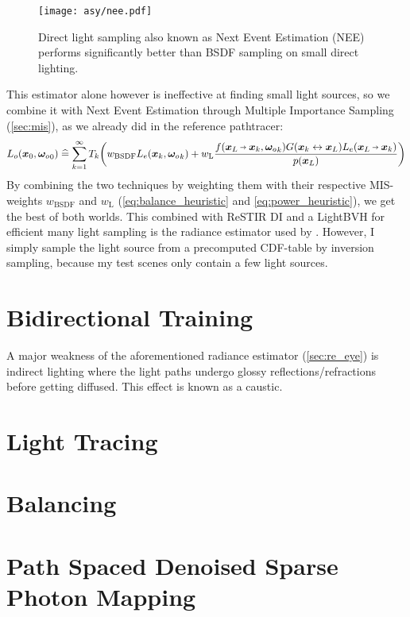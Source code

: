\begin{figure}[ht]
    \centering
    \texttt{[image: asy/nee.pdf]}
\caption{Direct light sampling also known as Next Event Estimation (NEE) performs significantly better than BSDF sampling on small direct lighting.}
\label{fig:nee}
\end{figure}
This estimator alone however is ineffective at finding small light sources, so we combine it with Next Event Estimation through Multiple Importance Sampling (\autoref{sec:mis}), as we already did in the reference pathtracer:
\begin{equation}
\begin{aligned}
    L_o(\vec{x}_0, \wo_0)
    \hateq \sum_{k=1}^{\infty} T_k \left( w_\text{BSDF} L_e(\x_k, \wo_k) + w_\text{L} \frac{f(\pdir{L}{k}, \wo_k) \G{k}{L} L_e(\pdir{L}{k})}{p(\x_L)} \right)
\end{aligned}
\end{equation}
By combining the two techniques by weighting them with their respective MIS-weights $w_\text{BSDF}$ and $w_\text{L}$ (\autoref{eq:balance_heuristic} and \autoref{eq:power_heuristic}), we get the best of both worlds.
This combined with ReSTIR DI  and a LightBVH  for efficient many light sampling is the radiance estimator used by \textcite{muller2021}.
However, I simply sample the light source from a precomputed CDF-table by inversion sampling, because my test scenes only contain a few light sources.

\section{Bidirectional Training}
\label{sec:re_bidir}
A major weakness of the aforementioned radiance estimator (\autoref{sec:re_eye}) is indirect lighting where the light paths undergo glossy reflections/refractions before getting diffused.
This effect is known as a caustic.

\section{Light Tracing}

\section{Balancing}

\section{Path Spaced Denoised Sparse Photon Mapping}

